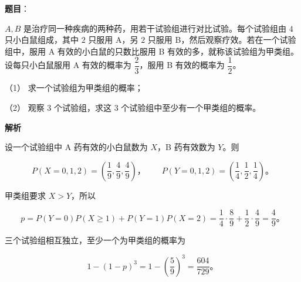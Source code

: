 \begin{answer}

\textbf{题目}：

$A,B$ 是治疗同一种疾病的两种药，用若干试验组进行对比试验。每个试验组由 $4$ 只小白鼠组成，其中 $2$ 只服用 A，另 $2$ 只服用 B，然后观察疗效。若在一个试验组中，服用 A 有效的小白鼠的只数比服用 B 有效的多，就称该试验组为甲类组。设每只小白鼠服用 A 有效的概率为 $\dfrac23$，服用 B 有效的概率为 $\dfrac12$。

（1） 求一个试验组为甲类组的概率；

（2） 观察 $3$ 个试验组，求这 $3$ 个试验组中至少有一个甲类组的概率。

\textbf{解析}


设一个试验组中 A 药有效的小白鼠数为 $X$，B 药有效数为 $Y$。则

\nopagebreak[4]
\[
P(X=0,1,2)=\left(\frac19,\frac49,\frac49\right)\text{，}\qquad
P(Y=0,1,2)=\left(\frac14,\frac12,\frac14\right)\text{。}
\]

甲类组要求 $X>Y$，所以

\nopagebreak[4]
\[
p=P(Y=0)P(X\geqslant1)+P(Y=1)P(X=2)
=\frac14\cdot\frac89+\frac12\cdot\frac49=\frac49\text{。}
\]


三个试验组相互独立，至少一个为甲类组的概率为

\nopagebreak[4]
\[
1-(1-p)^3=1-\left(\frac59\right)^3=\frac{604}{729}\text{。}
\]



\end{answer}
